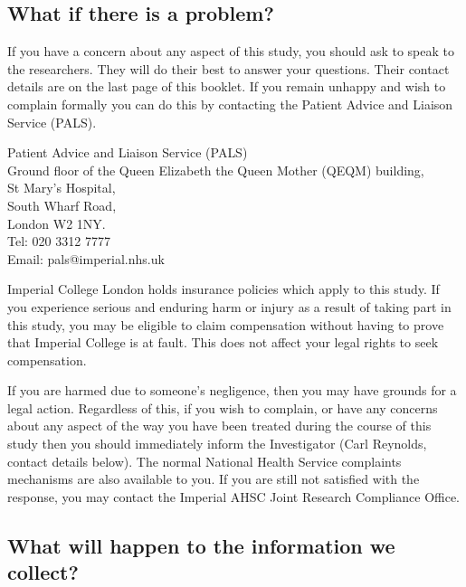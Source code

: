 \documentclass[a4paper,10pt]{article}
\begin{document}
\subsection*{What if there is a problem?}

If you have a concern about any aspect of this study, you should ask to speak to the researchers. They will do their best to answer your questions. Their contact details are on the last page of this booklet. If you remain unhappy and wish to complain formally you can do this by contacting the Patient Advice and Liaison Service (PALS). \\

\newpage

\begin{flushleft}

Patient Advice and Liaison Service (PALS) \\    
Ground floor of the Queen Elizabeth the Queen Mother (QEQM) building, \\
St Mary’s Hospital, \\
South Wharf Road,\\
London W2 1NY.\\
Tel: 020 3312 7777\\
Email: pals@imperial.nhs.uk\\

\end{flushleft}

Imperial College London holds insurance policies which apply to this study. If you experience serious and enduring harm or injury as a result of taking part in this study, you may be eligible to claim compensation without having to prove that Imperial College is at fault. This does not affect your legal rights to seek compensation.
 
If you are harmed due to someone’s negligence, then you may have grounds for a legal action. Regardless of this, if you wish to complain, or have any concerns about any aspect of the way you have been treated during the course of this study then you should immediately inform the Investigator (Carl Reynolds, contact details below). The normal National Health Service complaints mechanisms are also available to you. If you are still not satisfied with the response, you may contact the
Imperial AHSC Joint Research Compliance Office. 


\subsection*{What will happen to the information we collect?}
\end{document}

